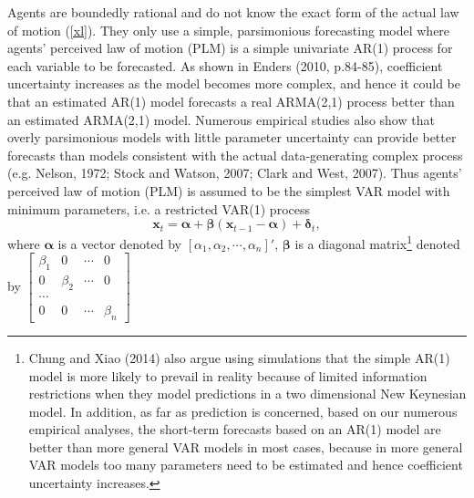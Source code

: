 Agents are boundedly rational and do not know the exact form of the actual law of motion (\ref{xl}). They only use a simple,
parsimonious forecasting model where agents' perceived law of motion (PLM) is a simple univariate AR(1) process for each variable to be forecasted. As shown in Enders (2010, p.84-85), coefficient uncertainty increases as the model becomes more complex, and hence it could be that an estimated AR(1) model forecasts a real ARMA(2,1) process better than an estimated ARMA(2,1) model. Numerous empirical studies also show
that overly parsimonious models with little parameter  uncertainty can provide better forecasts than models consistent with the actual data-generating complex process (e.g. Nelson, 1972; Stock and Watson,
2007; Clark and West, 2007). %
Thus agents' perceived law of motion (PLM) is assumed to be the simplest VAR model with minimum parameters, i.e. a restricted VAR(1) process
\begin{equation}\label{xplm}
{\pmb x}_t=\pmb{\alpha}+{\pmb\beta}({\pmb x}_{t-1}-{\pmb\alpha})+{\pmb\delta}_t,
\end{equation}
where $\pmb\alpha$ is a vector denoted by $[\alpha_1,
\alpha_2,\cdots, \alpha_n]'$, $\pmb\beta$ is a diagonal matrix\footnote{Chung and Xiao (2014) also argue using simulations that the simple AR(1) model is more likely to prevail in reality because of limited information restrictions when they model predictions in a two dimensional New Keynesian model. In addition, as far as prediction is concerned, based on our numerous empirical analyses, the short-term forecasts based on an AR(1) model are better than more general VAR models in most cases, because in more general VAR models too many parameters need to be estimated and hence coefficient uncertainty increases.%
}
denoted by $\left[\begin{array}{cccc}
\beta_1&0&\cdots&0\\
0&\beta_2&\cdots&0\\
\cdots&&&\\
0&0&\cdots&\beta_n
\end{array}\right]$
